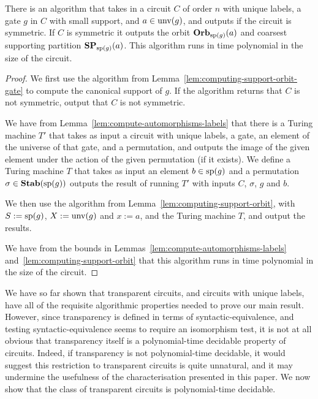 \documentclass[../paper.tex]{subfiles}
\begin{document}
\begin{lem}
  There is an algorithm that takes in a circuit $C$ of order $n$ with unique
  labels, a gate $g$ in $C$ with small support, and $a \in \text{unv}(g)$, and
  outputs if the circuit is symmetric. If $C$ is symmetric it outputs the orbit
  $\text{\textbf{Orb}}_{\text{sp}(g)} (a)$ and coarsest supporting partition $\text{\textbf{SP}}_{\text{sp}(g)}(a)$.
  This algorithm runs in time polynomial in the size of the circuit.
  \label{lem:computing-support-orbit-index}
\end{lem}
\begin{proof}
  We first use the algorithm from Lemma~\ref{lem:computing-support-orbit-gate}
  to compute the canonical support of $g$. If the algorithm returns that $C$ is
  not symmetric, output that $C$ is not symmetric.

  We have from Lemma~\ref{lem:compute-automorphisms-labels} that there is a
  Turing machine $T'$ that takes as input a circuit with unique labels, a gate,
  an element of the universe of that gate, and a permutation, and outputs the
  image of the given element under the action of the given permutation (if it
  exists). We define a Turing machine $T$ that takes as input an element $b \in
  \text{sp}(g)$ and a permutation $\sigma \in \text{\textbf{Stab}} (\text{sp} (g))$ outputs the result of
  running $T'$ with inputs $C$, $\sigma$, $g$ and $b$.

  We then use the algorithm from Lemma~\ref{lem:computing-support-orbit}, with
  $S := \text{sp}(g)$, $X := \text{unv}(g)$ and $x:= a$, and the Turing machine $T$,
  and output the results.

  We have from the bounds in Lemmas~\ref{lem:compute-automorphisms-labels}
  and~\ref{lem:computing-support-orbit} that this algorithm runs in time
  polynomial in the size of the circuit.
\end{proof}

We have so far shown that transparent circuits, and circuits with unique labels,
have all of the requisite algorithmic properties needed to prove our main
result. However, since transparency is defined in terms of
syntactic-equivalence, and testing syntactic-equivalence seems to require an
isomorphism test, it is not at all obvious that transparency itself is a
polynomial-time decidable property of circuits. Indeed, if transparency is not
polynomial-time decidable, it would suggest this restriction to transparent
circuits is quite unnatural, and it may undermine the usefulness of the
characterisation presented in this paper. We now show that the class of
transparent circuits is polynomial-time decidable.
\end{document}
